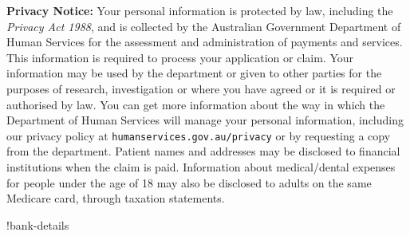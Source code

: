 \documentclass[12pt]{article}
\begin{document}
\begin{spacing}{0.3}
{{\bf Privacy Notice:} Your personal information is protected by law, including the \emph{Privacy Act 1988}, and is collected by the Australian Government Department of Human Services for the assessment and administration of payments and services. This information is required to process your application or claim. 
Your information may be used by the department or given to other parties for the purposes of research, investigation or where you have agreed or it is required or authorised by law. 
You can get more information about the way in which the Department of Human Services will manage your personal information, including our privacy policy at \texttt{humanservices.gov.au/privacy} or by requesting a copy from the department.
Patient names and addresses may be disclosed to financial institutions when the claim is paid. Information about medical/dental expenses for people under the age of 18 may also be disclosed to adults on the same Medicare card, through taxation statements.

\vspace{1mm}

!bank-details}
\end{spacing}
\end{document}
